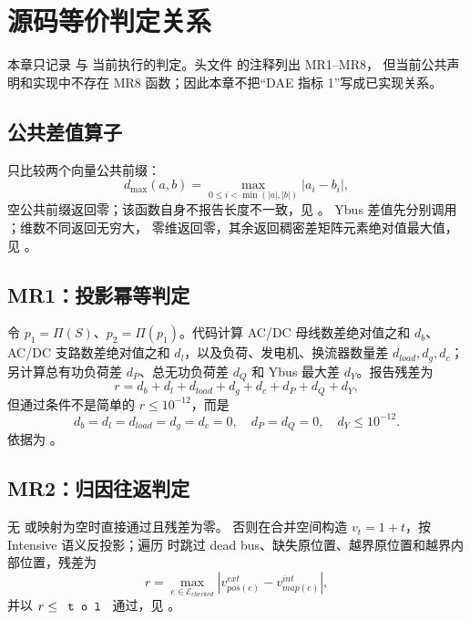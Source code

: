 \section{源码等价判定关系}

本章只记录  与
 当前执行的判定。头文件
 的注释列出 MR1--MR8，
但当前公共声明和实现中不存在 MR8 函数；因此本章不把“DAE 指标 1”写成已实现关系。

\subsection{公共差值算子}

 只比较两个向量公共前缀：
\begin{equation}
 d_{\max}(a,b)=\max_{0\le i<\min(|a|,|b|)}|a_i-b_i|,
\end{equation}
空公共前缀返回零；该函数自身不报告长度不一致，见
。
Ybus 差值先分别调用 ；维数不同返回无穷大，
零维返回零，其余返回稠密差矩阵元素绝对值最大值，见
。

\subsection{MR1：投影幂等判定}

令 $p_1=\Pi(S)$、$p_2=\Pi(p_1)$。代码计算 AC/DC 母线数差绝对值之和
$d_b$、AC/DC 支路数差绝对值之和 $d_l$，以及负荷、发电机、换流器数量差
$d_{load},d_g,d_c$；另计算总有功负荷差 $d_P$、总无功负荷差 $d_Q$ 和
Ybus 最大差 $d_Y$。报告残差为
\begin{equation}
 r=d_b+d_l+d_{load}+d_g+d_c+d_P+d_Q+d_Y,
\end{equation}
但通过条件不是简单的 $r\le10^{-12}$，而是
\begin{equation}
 d_b=d_l=d_{load}=d_g=d_c=0,\quad d_P=d_Q=0,\quad d_Y\le10^{-12}.
\end{equation}
依据为 。

\subsection{MR2：归因往返判定}

无  或映射为空时直接通过且残差为零。
否则在合并空间构造 $v_t=1+t$，按 Intensive 语义反投影；遍历
 时跳过 dead bus、缺失原位置、越界原位置和越界内部位置，残差为
\begin{equation}
 r=\max_{e\in\mathcal E_{checked}}|v^{ext}_{pos(e)}-v^{int}_{map(e)}|,
\end{equation}
并以 $r\le\fld{tol}$ 通过，见 。

